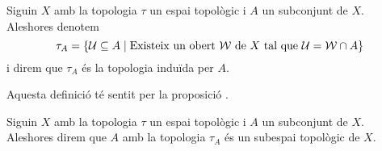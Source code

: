 \documentclass[../../Main.tex]{subfiles}
\begin{document}
	\begin{definition}
		\label{def:topologia induida per un subconjunt}
		Siguin \(X\) amb la topologia \(\tau\) un espai topològic i \(A\) un subconjunt de \(X\). Aleshores denotem
		\[
		    \tau_{A}=\{\mathcal{U}\subseteq A\mid\text{Existeix un obert }\mathcal{W}\text{ de }X\text{ tal que }\mathcal{U}=\mathcal{W}\cap A\}
		\]
		i direm que \(\tau_{A}\) és la topologia induïda per \(A\).
		
		Aquesta definició té sentit per la proposició .
	\end{definition}
	\begin{definition}
		\label{def:subespai topològic}
		Siguin \(X\) amb la topologia \(\tau\) un espai topològic i \(A\) un subconjunt de \(X\). Aleshores direm que \(A\) amb la topologia \(\tau_{A}\) és un subespai topològic de \(X\).
	\end{definition}
\end{document}
